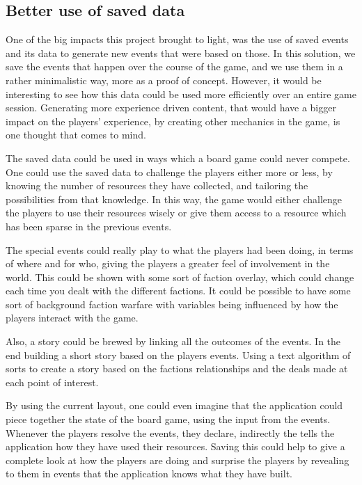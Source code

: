 \subsection{Better use of saved data}
\label{sec:savdat}
One of the big impacts this project brought to light, was the use of saved events and its data to generate new events that were based on those. In this solution, we save the events that happen over the course of the game, and we use them in a rather minimalistic way, more as a proof of concept. However, it would be interesting to see how this data could be used more efficiently over an entire game session. Generating more experience driven content, that would have a bigger impact on the players' experience, by creating other mechanics in the game, is one thought that comes to mind. 

The saved data could be used in ways which a board game could never compete. One could use the saved data to challenge the players either more or less, by knowing the number of resources they have collected, and tailoring the possibilities from that knowledge. In this way, the game would either challenge the players to use their resources wisely or give them access to a resource which has been sparse in the previous events. 

The special events could really play to what the players had been doing, in terms of where and for who, giving the players a greater feel of involvement in the world. This could be shown with some sort of faction overlay, which could change each time you dealt with the different factions. It could be possible to have some sort of background faction warfare with variables being influenced by how the players interact with the game.

Also, a story could be brewed by linking all the outcomes of the events. In the end building a short story based on the players events. Using a text algorithm of sorts to create a story based on the factions relationships and the deals made at each point of interest. 

By using the current layout, one could even imagine that the application could piece together the state of the board game, using the input from the events. Whenever the players resolve the events, they declare, indirectly the tells the application how they have used their resources. Saving this could help to give a complete look at how the players are doing and surprise the players by revealing to them in events that the application knows what they have built.

